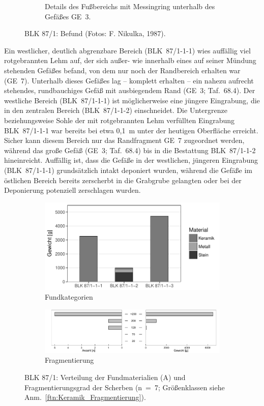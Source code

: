 \begin{figure}[p]
\begin{subfigure}[t]{\columnwidth}
		\caption{Details des Fußbereichs mit Messingring unterhalb des Gefäßes GE~3.}
		\label{fig:BLK87-1_Fussbereich}
	\end{subfigure}
	\caption{BLK 87/1: Befund (Fotos: F. Nikulka, 1987).}
	\label{fig:BLK87-1_Foto}
\end{figure}

Ein westlicher, deutlich abgrenzbare Bereich (BLK~87/1-1-1) wies auffällig viel rotgebrannten Lehm auf, der sich außer- wie innerhalb eines auf seiner Mündung stehenden Gefäßes befand, von dem nur noch der Randbereich erhalten war (GE~7). Unterhalb dieses Gefäßes lag -- komplett erhalten -- ein nahezu aufrecht stehendes, rundbauchiges Gefäß mit ausbiegendem Rand (GE~3; Taf.~68.4). Der westliche Bereich (BLK~87/1-1-1) ist möglicherweise eine jüngere Eingrabung, die in den zentralen Bereich (BLK~87/1-1-2) einschneidet. Die Untergrenze beziehungsweise Sohle der mit rotgebrannten Lehm verfüllten Eingrabung BLK~87/1-1-1 war bereits bei etwa 0,1~m unter der heutigen Oberfläche erreicht. Sicher kann diesem Bereich nur das Randfragment GE~7 zugeordnet werden, während das große Gefäß (GE~3; Taf.~68.4) bis in die Bestattung BLK~87/1-1-2 hineinreicht. Auffällig ist, dass die Gefäße in der westlichen, jüngeren Eingrabung (BLK~87/1-1-1) grundsätzlich intakt deponiert wurden, während die Gefäße im östlichen Bereich bereits zerscherbt in die Grabgrube gelangten oder bei der Deponierung potenziell zerschlagen wurden.

\begin{figure}[tb!]
	\centering
	\begin{subfigure}{1\textwidth}	
		\centering
		\includegraphics[width=.5\textwidth]{fig/9-11_BLK87-1_VerteilungFunde_R.pdf}
		\caption{Fundkategorien}
		\label{fig:BLK87-1_FundeTypen}
	\end{subfigure}
	\begin{subfigure}{1\textwidth}	
		\centering
		\includegraphics[width=\textwidth]{fig/9-11_BLK87-1_Fragmentierung_2.pdf}
		\caption{Fragmentierung}
		\label{fig:BLK87-1_Keramik_Fragm}
	\end{subfigure}
	\caption{BLK 87/1: Verteilung der Fundmaterialien (A) und Fragmentierungsgrad der Scherben (n~=~7; Größenklassen siehe Anm.~\ref{ftn:Keramik_Fragmentierung}).}
	\label{fig:BLK87-1_Funde}
\end{figure}

